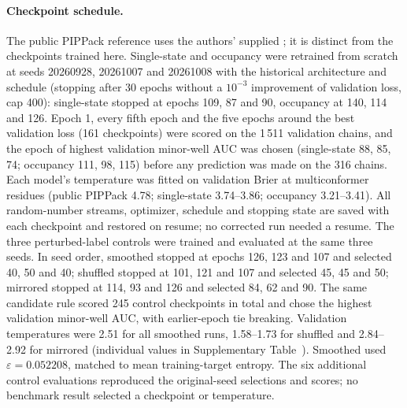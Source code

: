 \documentclass[10pt,twocolumn,a4paper]{article}
\begin{document}
\paragraph{Checkpoint schedule.} The public PIPPack reference uses the authors' supplied ; it is distinct from the checkpoints trained here. Single-state and occupancy were retrained from scratch at seeds 20260928, 20261007 and
20261008 with the historical architecture and schedule (stopping after 30 epochs
without a $10^{-3}$ improvement of validation loss, cap 400): single-state stopped at
epochs 109, 87 and 90, occupancy at 140, 114 and 126. Epoch 1, every fifth epoch and the
five epochs around the best validation loss (161 checkpoints) were scored on the 1\,511
validation chains, and the epoch of highest validation minor-well AUC was chosen
(single-state 88, 85, 74; occupancy 111, 98, 115) before any prediction was made on the
316 chains. Each model's temperature was fitted on validation Brier at multiconformer
residues (public PIPPack 4.78; single-state 3.74--3.86; occupancy 3.21--3.41). All random-number
streams, optimizer, schedule and stopping state are saved with each checkpoint and
restored on resume; no corrected run needed a resume. The three perturbed-label controls were trained and evaluated at the same three seeds. In seed order, smoothed stopped at epochs 126, 123 and 107 and selected 40, 50 and 40; shuffled stopped at 101, 121 and 107 and selected 45, 45 and 50; mirrored stopped at 114, 93 and 126 and selected 84, 62 and 90. The same candidate rule scored 245 control checkpoints in total and chose the highest validation minor-well AUC, with earlier-epoch tie breaking. Validation temperatures were 2.51 for all smoothed runs, 1.58--1.73 for shuffled and 2.84--2.92 for mirrored (individual values in Supplementary Table~). Smoothed used $\varepsilon=0.052208$, matched to mean training-target entropy. The six additional control evaluations reproduced the original-seed selections and scores; no benchmark result selected a checkpoint or temperature.
\end{document}
